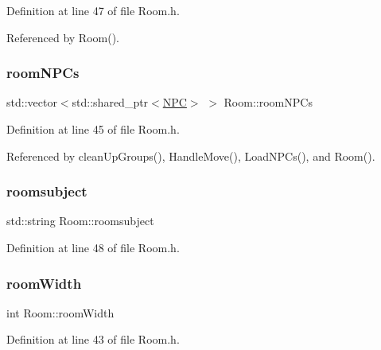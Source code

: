 Definition at line 47 of file Room.\+h.



Referenced by Room().

\mbox{\label{class_room_a34bdf24cc8c52d638bcfd851c295f23b}} 
\subsubsection{\texorpdfstring{room\+N\+P\+Cs}{roomNPCs}}
{\footnotesize\ttfamily std\+::vector$<$std\+::shared\+\_\+ptr$<$\hyperlink{class_n_p_c}{N\+PC}$>$ $>$ Room\+::room\+N\+P\+Cs\hspace{0.3cm}{\ttfamily [private]}}



Definition at line 45 of file Room.\+h.



Referenced by clean\+Up\+Groups(), Handle\+Move(), Load\+N\+P\+Cs(), and Room().

\mbox{\label{class_room_a469d309dfc2c2693c27cbcb512f9c14c}} 
\subsubsection{\texorpdfstring{roomsubject}{roomsubject}}
{\footnotesize\ttfamily std\+::string Room\+::roomsubject\hspace{0.3cm}{\ttfamily [private]}}



Definition at line 48 of file Room.\+h.

\mbox{\label{class_room_a3538dc1a9a08a492cec337399db77259}} 
\subsubsection{\texorpdfstring{room\+Width}{roomWidth}}
{\footnotesize\ttfamily int Room\+::room\+Width\hspace{0.3cm}{\ttfamily [private]}}



Definition at line 43 of file Room.\+h.



